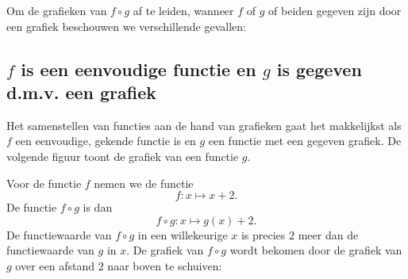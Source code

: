 \documentclass{ximera}
\begin{document}
Om de grafieken van $f\circ g$ af te leiden, wanneer $f$ of $g$ of
beiden gegeven zijn door een grafiek beschouwen we verschillende gevallen:

\subsection{$f$ is een eenvoudige functie en $g$ is gegeven d.m.v.  een grafiek}

Het samenstellen van functies aan de hand van grafieken gaat het
makkelijkst als $f$ een eenvoudige, gekende functie is en $g$ een
functie met een gegeven grafiek. De volgende figuur toont de grafiek
van een functie $g$.

\begin{center}
\end{center}

Voor de functie $f$ nemen we de functie
\[
f:x\mapsto x+2.
\]
De functie $f\circ g$ is dan
\[
f\circ g: x\mapsto g(x)+2.
\]
De functiewaarde van $f\circ g$ in een willekeurige $x$ is precies $2$
meer dan de functiewaarde van $g$ in $x$. De grafiek van $f\circ g$
wordt bekomen door de grafiek van $g$ over een afstand $2$ naar boven
te schuiven:

\begin{center}
\end{center}
\end{document}
